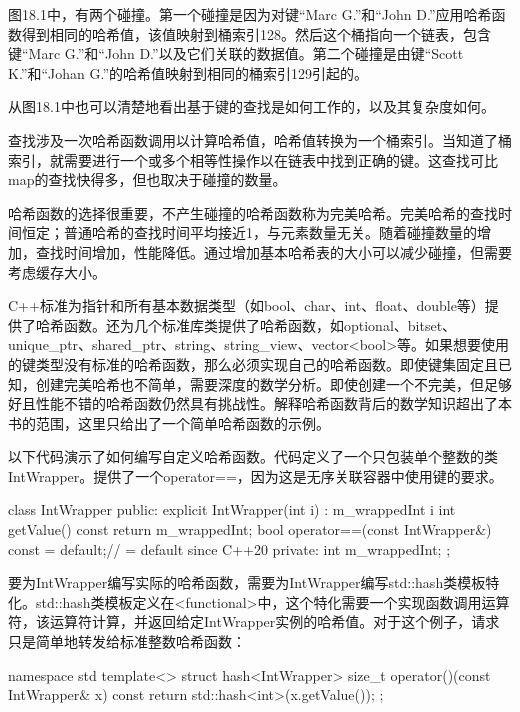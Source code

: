
图18.1中，有两个碰撞。第一个碰撞是因为对键“Marc G.”和“John D.”应用哈希函数得到相同的哈希值，该值映射到桶索引128。然后这个桶指向一个链表，包含键“Marc G.”和“John D.”以及它们关联的数据值。第二个碰撞是由键“Scott K.”和“Johan G.”的哈希值映射到相同的桶索引129引起的。

从图18.1中也可以清楚地看出基于键的查找是如何工作的，以及其复杂度如何。

查找涉及一次哈希函数调用以计算哈希值，哈希值转换为一个桶索引。当知道了桶索引，就需要进行一个或多个相等性操作以在链表中找到正确的键。这查找可比map的查找快得多，但也取决于碰撞的数量。

哈希函数的选择很重要，不产生碰撞的哈希函数称为完美哈希。完美哈希的查找时间恒定；普通哈希的查找时间平均接近1，与元素数量无关。随着碰撞数量的增加，查找时间增加，性能降低。通过增加基本哈希表的大小可以减少碰撞，但需要考虑缓存大小。

C++标准为指针和所有基本数据类型（如bool、char、int、float、double等）提供了哈希函数。还为几个标准库类提供了哈希函数，如optional、bitset、unique\_ptr、shared\_ptr、string、string\_view、vector<bool>等。如果想要使用的键类型没有标准的哈希函数，那么必须实现自己的哈希函数。即使键集固定且已知，创建完美哈希也不简单，需要深度的数学分析。即使创建一个不完美，但足够好且性能不错的哈希函数仍然具有挑战性。解释哈希函数背后的数学知识超出了本书的范围，这里只给出了一个简单哈希函数的示例。

以下代码演示了如何编写自定义哈希函数。代码定义了一个只包装单个整数的类IntWrapper。提供了一个operator==，因为这是无序关联容器中使用键的要求。

\begin{cpp}
class IntWrapper
{
    public:
        explicit IntWrapper(int i) : m_wrappedInt { i } {}
        int getValue() const { return m_wrappedInt; }
        bool operator==(const IntWrapper&) const = default;// = default since C++20
    private:
        int m_wrappedInt;
};
\end{cpp}

要为IntWrapper编写实际的哈希函数，需要为IntWrapper编写std::hash类模板特化。std::hash类模板定义在<functional>中，这个特化需要一个实现函数调用运算符，该运算符计算，并返回给定IntWrapper实例的哈希值。对于这个例子，请求只是简单地转发给标准整数哈希函数：

\begin{cpp}
namespace std
{
    template<> struct hash<IntWrapper>
    {
        size_t operator()(const IntWrapper& x) const {
            return std::hash<int>{}(x.getValue());
        }
    };
}
\end{cpp}

